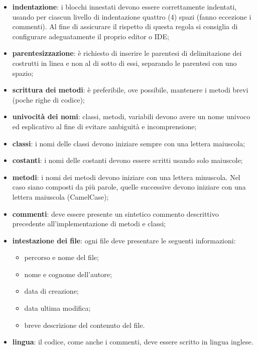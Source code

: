 				\begin{itemize}
					\item \textbf{indentazione}: i blocchi innestati devono essere correttamente 
						indentati, usando per ciascun livello di indentazione quattro (4) spazi (fanno 
						eccezione i commenti). Al fine di assicurare il rispetto di questa regola si 
						consiglia di configurare adeguatamente il proprio editor o IDE;
					\item \textbf{parentesizzazione}: è richiesto di inserire 
					le parentesi di delimitazione dei costrutti in linea e non 
					al di sotto di essi, separando le parentesi con uno spazio;
					\item \textbf{scrittura dei metodi}: è preferibile, ove possibile, 
						mantenere i metodi brevi (poche righe di codice);
					\item \textbf{univocità dei nomi}: classi, metodi, variabili devono avere un 
						nome univoco	ed esplicativo al fine di evitare ambiguità e incomprensione;
					\item \textbf{classi}: i nomi delle classi devono iniziare sempre con una 
						lettera maiuscola;		
					\item \textbf{costanti}: i nomi delle costanti devono essere scritti usando 
						solo maiuscole;
					\item \textbf{metodi}: i nomi dei metodi devono iniziare con una lettera 
						minuscola. Nel caso siano composti da più parole, quelle successive devono iniziare con una 
						lettera maiuscola (CamelCase\glo{});
					\item \textbf{commenti}: deve essere presente un sintetico commento descrittivo precedente all'implementazione di metodi e classi;
					\item \textbf{intestazione dei file}: ogni file deve presentare le seguenti informazioni:
						\begin{itemize}
							\item percorso e nome del file;
							\item nome e cognome dell'autore;
							\item data di creazione;
							\item data ultima modifica;
							\item breve descrizione del contenuto del file.
						\end{itemize}
					\item \textbf{lingua}: il codice, come anche i commenti, deve essere scritto 
						in lingua inglese.
				\end{itemize}
